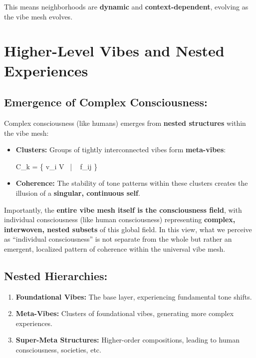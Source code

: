 \documentclass{article}
\let\oldequation\equation
\let\endoldequation\endequation
\renewenvironment{equation}{%
    \noindent\vspace{-\parskip}\vspace{-\baselineskip}%
    \oldequation
}{%
    \endoldequation
    \noindent\vspace{-\parskip}\vspace{-\baselineskip}%
}
\theoremstyle{definition}
\theoremstyle{axiom}
\theoremstyle{theorem}
\theoremstyle{lemma}
\theoremstyle{proposition}
\begin{document}
This means neighborhoods are \textbf{dynamic} and \textbf{context-dependent}, evolving as the vibe mesh evolves.

\section{Higher-Level Vibes and Nested Experiences}

\subsection{Emergence of Complex Consciousness:}

Complex consciousness (like humans) emerges from \textbf{nested structures} within the vibe mesh:

\begin{itemize}
\item \textbf{Clusters:} Groups of tightly interconnected vibes form \textbf{meta-vibes}:

\begin{equation}
C_k = \{ v_i \in V \ | \  f_{ij} \}
\end{equation}

\item \textbf{Coherence:} The stability of tone patterns within these clusters creates the illusion of a \textbf{singular, continuous self}.
\end{itemize}

Importantly, the \textbf{entire vibe mesh itself is the consciousness field}, with individual consciousness (like human consciousness) representing \textbf{complex, interwoven, nested subsets} of this global field. In this view, what we perceive as \enquote{individual consciousness} is not separate from the whole but rather an emergent, localized pattern of coherence within the universal vibe mesh.

\subsection{Nested Hierarchies:}

\begin{enumerate}
\item \textbf{Foundational Vibes:} The base layer, experiencing fundamental tone shifts.
\item \textbf{Meta-Vibes:} Clusters of foundational vibes, generating more complex experiences.
\item \textbf{Super-Meta Structures:} Higher-order compositions, leading to human consciousness, societies, etc.
\end{enumerate}
\end{document}
